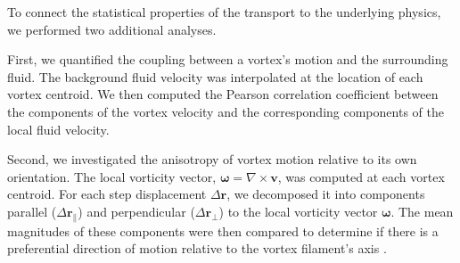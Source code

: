 \documentclass[]{article}
\begin{document}
To connect the statistical properties of the transport to the underlying physics, we performed two additional analyses.

First, we quantified the coupling between a vortex's motion and the surrounding fluid. The background fluid velocity was interpolated at the location of each vortex centroid. We then computed the Pearson correlation coefficient between the components of the vortex velocity and the corresponding components of the local fluid velocity.

Second, we investigated the anisotropy of vortex motion relative to its own orientation. The local vorticity vector, $\boldsymbol{\omega} = \nabla \times \mathbf{v}$, was computed at each vortex centroid. For each step displacement $\Delta\mathbf{r}$, we decomposed it into components parallel ($\Delta\mathbf{r}_\parallel$) and perpendicular ($\Delta\mathbf{r}_\perp$) to the local vorticity vector $\boldsymbol{\omega}$. The mean magnitudes of these components were then compared to determine if there is a preferential direction of motion relative to the vortex filament's axis \citep{zhang2019imaginganisotropicvortexdynamics}.
\end{document}
